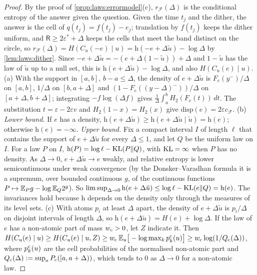 \begin{proof}
By the proof of \cref{prop:laws:errormodel}(c), $r_{\mathcal F}(\Delta)$ is the conditional entropy of the answer given the question. Given the time $t_j$ and the dither, the answer is the cell of $q(t_j)=f(t_j)-e_j$; translation by $f(t_j)$ keeps the dither uniform, and $\mathsf R\ge2\varepsilon^*+\Delta$ keeps the cells that meet the band distinct on the circle, so $r_{\mathcal F}(\Delta)=H(C_u(-e)\mid u)=\mathrm h(-e+\Delta\tilde u)-\log\Delta$ by \cref{lem:laws:dither}. Since $-e+\Delta\tilde u=-(e+\Delta(1-\tilde u))+\Delta$ and $1-\tilde u$ has the law of $\tilde u$ up to a null set, this is $\mathrm h(e+\Delta\tilde u)-\log\Delta$, and also $H(C_u(e)\mid u)$. (a) With the support in $[a,b]$, $b-a\le\Delta$, the density of $e+\Delta\tilde u$ is $F_e(y^-)/\Delta$ on $[a,b]$, $1/\Delta$ on $[b,a+\Delta]$ and $(1-F_e((y-\Delta)^-))/\Delta$ on $[a+\Delta,b+\Delta]$; integrating $-f\log(\Delta f)$ gives $\frac1\Delta\int_a^bH_2(F_e(t))\,dt$. The substitution $t=\varepsilon-2\varepsilon v$ and $H_2(1-x)=H_2(x)$ give $\mathrm{disp}(e)=2\varepsilon c_{\mathcal F}$. (b) \emph{Lower bound.} If $e$ has a density, $\mathrm h(e+\Delta\tilde u)\ge\mathrm h(e+\Delta\tilde u\mid\tilde u)=\mathrm h(e)$; otherwise $\mathrm h(e)=-\infty$. \emph{Upper bound.} Fix a compact interval $I$ of length $\ell$ that contains the support of $e+\Delta\tilde u$ for every $\Delta\le1$, and let $Q$ be the uniform law on $I$. For a law $P$ on $I$, $\mathrm h(P)=\log\ell-\operatorname{KL}(P\Vert Q)$, with $\operatorname{KL}=\infty$ when $P$ has no density. As $\Delta\to0$, $e+\Delta\tilde u\to e$ weakly, and relative entropy is lower semicontinuous under weak convergence (by the Donsker--Varadhan formula it is a supremum, over bounded continuous $g$, of the continuous functions $P\mapsto\mathbb{E}_Pg-\log\mathbb{E}_Q2^g$). So $\limsup_{\Delta\to0}\mathrm h(e+\Delta\tilde u)\le\log\ell-\operatorname{KL}(e\Vert Q)=\mathrm h(e)$. The invariances hold because $\mathrm h$ depends on the density only through the measures of its level sets. (c) With atoms $p_i$ at least $\Delta$ apart, the density of $e+\Delta\tilde u$ is $p_i/\Delta$ on disjoint intervals of length $\Delta$, so $\mathrm h(e+\Delta\tilde u)=H(e)+\log\Delta$. If the law of $e$ has a non-atomic part of mass $w_{\rm c}>0$, let $Z$ indicate it. Then $H(C_u(e)\mid u)\ge H(C_u(e)\mid u,Z)\ge w_{\rm c}\,\mathbb{E}_u\big[-\log\max_kp^{\rm c}_k(u)\big]\ge w_{\rm c}\log(1/Q_{\rm c}(\Delta))$, where $p^{\rm c}_k(u)$ are the cell probabilities of the normalised non-atomic part and $Q_{\rm c}(\Delta):=\sup_aP_{\rm c}([a,a+\Delta))$, which tends to $0$ as $\Delta\to0$ for a non-atomic law.
\end{proof}


